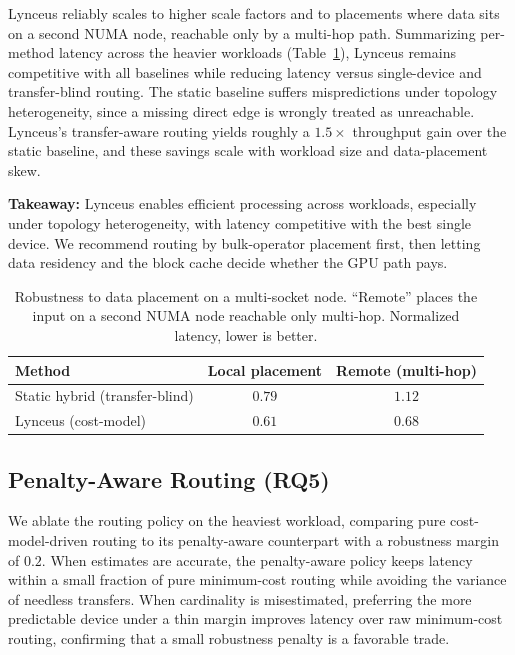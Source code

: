 \documentclass{article}
\begin{document}
Lynceus reliably scales to higher scale factors and to placements where data sits
on a second NUMA node, reachable only by a multi-hop path. Summarizing per-method
latency across the heavier workloads (Table~\ref{tab:scaling}), Lynceus remains
competitive with all baselines while reducing latency versus single-device and
transfer-blind routing. The static baseline suffers mispredictions under topology
heterogeneity, since a missing direct edge is wrongly treated as unreachable.
Lynceus's transfer-aware routing yields roughly a $1.5\times$ throughput gain over
the static baseline, and these savings scale with workload size and data-placement
skew.

\textbf{Takeaway:} Lynceus enables efficient processing across workloads,
especially under topology heterogeneity, with latency competitive with the best
single device. We recommend routing by bulk-operator placement first, then
letting data residency and the block cache decide whether the GPU path pays.

\begin{table}[t]
\centering
\caption{Robustness to data placement on a multi-socket node. ``Remote'' places
the input on a second NUMA node reachable only multi-hop. Normalized latency,
lower is better.}
\label{tab:scaling}
\begin{tabular}{lcc}
\toprule
Method & Local placement & Remote (multi-hop) \\
\midrule
Static hybrid (transfer-blind) & $0.79$ & $1.12$ \\
Lynceus (cost-model)           & $0.61$ & $0.68$ \\
\bottomrule
\end{tabular}
\end{table}

\subsection{Penalty-Aware Routing (RQ5)}
\label{sec:rq5}

We ablate the routing policy on the heaviest workload, comparing pure
cost-model-driven routing to its penalty-aware counterpart with a robustness
margin of $0.2$. When estimates are accurate, the penalty-aware policy keeps
latency within a small fraction of pure minimum-cost routing while avoiding the
variance of needless transfers. When cardinality is misestimated, preferring the
more predictable device under a thin margin improves latency over raw minimum-cost
routing, confirming that a small robustness penalty is a favorable trade.
\end{document}
